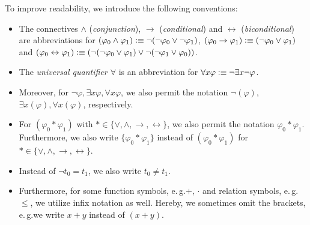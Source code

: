 To improve readability, we introduce the following conventions:
\begin{itemize}
\item The connectives $\wedge$ (\textit{conjunction}), $\rightarrow$ (\textit{conditional}) and $\leftrightarrow$ (\textit{biconditional}) are abbreviations for $(\varphi_0 \wedge \varphi_1) \vcentcolon \equiv \lnot (\lnot \varphi_0 \vee  \lnot \varphi_1)$, $(\varphi_0 \rightarrow \varphi_1) \vcentcolon \equiv (\lnot \varphi_0 \vee \varphi_1)$ and $(\varphi_0 \leftrightarrow \varphi_1) \vcentcolon \equiv (\lnot(\lnot \varphi_0 \vee \varphi_1 ) \vee \lnot (\lnot \varphi_1 \vee \varphi_0))$.
\item The \textit{universal quantifier $\forall$} is an abbreviation for $\forall x \varphi \vcentcolon \equiv \lnot \exists x \lnot \varphi$.
\item Moreover, for $\lnot \varphi, \exists x \varphi, \forall x \varphi$, we also permit the notation $\lnot (\varphi)$, $\exists x (\varphi), \forall x (\varphi)$, respectively.
\item For $(\varphi_0 * \varphi_1)$ with $* \in \lbrace \vee, \wedge, \rightarrow, \leftrightarrow \rbrace$, we also permit the notation $\varphi_0 * \varphi_1$. Furthermore, we also write $\lbrace \varphi_0 * \varphi_1 \rbrace$ instead of $(\varphi_0 * \varphi_1)$ for $* \in \lbrace \vee, \wedge, \rightarrow, \leftrightarrow \rbrace$.
\item Instead of $\lnot t_0 = t_1 $, we also write $t_0 \neq t_1$.
\item Furthermore, for some function symbols, e.\,g.\@ $+$, $\cdot$ and relation symbols, e.\,g.\@ $\le$, we utilize infix notation as well. Hereby, we sometimes omit the brackets, e.\,g.\@ we write $x+y$ instead of $(x+y)$.
\end{itemize}

